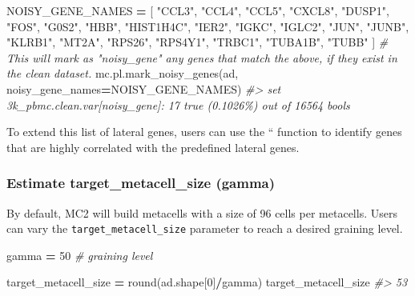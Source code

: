 \documentclass[
]{book}
\newenvironment{Shaded}{\begin{snugshade}}{\end{snugshade}}
\newcommand{\BuiltInTok}[1]{#1}
\newcommand{\CommentTok}[1]{\textcolor[rgb]{0.56,0.35,0.01}{\textit{#1}}}
\newcommand{\DecValTok}[1]{\textcolor[rgb]{0.00,0.00,0.81}{#1}}
\newcommand{\NormalTok}[1]{#1}
\newcommand{\OperatorTok}[1]{\textcolor[rgb]{0.81,0.36,0.00}{\textbf{#1}}}
\newcommand{\StringTok}[1]{\textcolor[rgb]{0.31,0.60,0.02}{#1}}
\begin{document}
\begin{Shaded}
\begin{Highlighting}[]

\NormalTok{NOISY\_GENE\_NAMES }\OperatorTok{=}\NormalTok{ [}
    \StringTok{"CCL3"}\NormalTok{, }\StringTok{"CCL4"}\NormalTok{, }\StringTok{"CCL5"}\NormalTok{, }\StringTok{"CXCL8"}\NormalTok{, }\StringTok{"DUSP1"}\NormalTok{, }\StringTok{"FOS"}\NormalTok{, }\StringTok{"G0S2"}\NormalTok{, }\StringTok{"HBB"}\NormalTok{, }\StringTok{"HIST1H4C"}\NormalTok{, }\StringTok{"IER2"}\NormalTok{, }\StringTok{"IGKC"}\NormalTok{,}
    \StringTok{"IGLC2"}\NormalTok{, }\StringTok{"JUN"}\NormalTok{, }\StringTok{"JUNB"}\NormalTok{, }\StringTok{"KLRB1"}\NormalTok{, }\StringTok{"MT2A"}\NormalTok{, }\StringTok{"RPS26"}\NormalTok{, }\StringTok{"RPS4Y1"}\NormalTok{, }\StringTok{"TRBC1"}\NormalTok{, }\StringTok{"TUBA1B"}\NormalTok{, }\StringTok{"TUBB"}
\NormalTok{]}
\CommentTok{\# This will mark as "noisy\_gene" any genes that match the above, if they exist in the clean dataset.}
\NormalTok{mc.pl.mark\_noisy\_genes(ad, noisy\_gene\_names}\OperatorTok{=}\NormalTok{NOISY\_GENE\_NAMES)}
\CommentTok{\#\textgreater{} set 3k\_pbmc.clean.var[noisy\_gene]: 17 true (0.1026\%) out of 16564 bools}
\end{Highlighting}
\end{Shaded}

To extend this list of lateral genes, users can use the `` function to identify genes that are highly correlated with the predefined lateral genes.

\hypertarget{estimate-target_metacell_size-gamma}{%
\subsubsection*{Estimate target\_metacell\_size (gamma)}\label{estimate-target_metacell_size-gamma}}

By default, MC2 will build metacells with a size of 96 cells per metacells.
Users can vary the \texttt{target\_metacell\_size} parameter to reach a desired graining level.

\begin{Shaded}
\begin{Highlighting}[]
\NormalTok{gamma   }\OperatorTok{=} \DecValTok{50} \CommentTok{\# graining level}

\NormalTok{target\_metacell\_size }\OperatorTok{=} \BuiltInTok{round}\NormalTok{(ad.shape[}\DecValTok{0}\NormalTok{]}\OperatorTok{/}\NormalTok{gamma)}
\NormalTok{target\_metacell\_size}
\CommentTok{\#\textgreater{} 53}
\end{Highlighting}
\end{Shaded}
\end{document}
